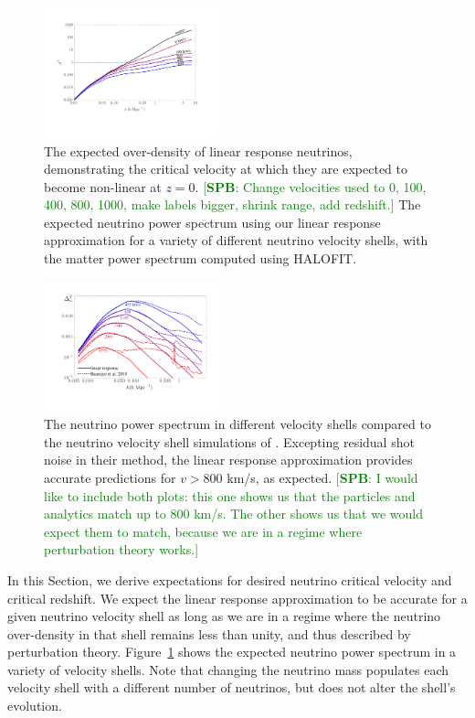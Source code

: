 \documentclass[useAMS, usenatbib]{mnras}
\newcommand{\spb}[1]{{\textcolor{green}{[{\bf SPB}: #1]}}}
\begin{document}
\begin{figure}
\includegraphics[width=0.45\textwidth]{nuplots/lin_resp_halofit.pdf}
\caption{The expected over-density of linear response neutrinos, demonstrating the critical velocity at which they are expected to become non-linear at $z=0$. \spb{Change velocities used to 0, 100, 400, 800, 1000, make labels bigger, shrink range, add redshift.} The expected neutrino power spectrum using our linear response approximation for a variety of different neutrino velocity shells, with the matter power spectrum computed using {\small HALOFIT}.}
\label{fig:halofitvshell}
\end{figure}

\begin{figure}
  \includegraphics[width=0.45\textwidth]{nuplots/banerjee_lin_resp.pdf}
  \caption{
  The neutrino power spectrum in different velocity shells compared to the neutrino velocity shell simulations of \protect\cite{Banerjee_2018}. Excepting residual shot noise in their method, the linear response approximation provides accurate predictions for $v > 800$ km/s, as expected. \spb{I would like to include both plots: this one shows us that the particles and analytics match up to 800 km/s. The other shows us that we would expect them to match, because we are in a regime where perturbation theory works.}
  }
  \label{fig:simvshell}
\end{figure}

In this Section, we derive expectations for desired neutrino critical velocity and critical redshift.
We expect the linear response approximation to be accurate for a given neutrino velocity shell as long
as we are in a regime where the neutrino over-density in that shell remains less than unity, and thus described by perturbation theory. Figure~\ref{fig:halofitvshell} shows the expected neutrino power spectrum in a variety of velocity shells. Note that changing the neutrino mass populates each velocity shell with a different number of neutrinos, but does not alter the shell's evolution.
\end{document}

